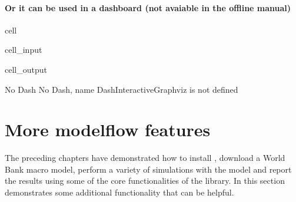\documentclass[letterpaper,10pt,english]{jupyterBook}
\begin{document}
\subsection{Or it can be used in a dashboard (not avaiable in the offline manual)}
\label{\detokenize{content/06_ModelAnalytics/Attribution:or-it-can-be-used-in-a-dashboard-not-avaiable-in-the-offline-manual}}
\begin{sphinxuseclass}{cell}\begin{sphinxVerbatimInput}

\begin{sphinxuseclass}{cell_input}
\begin{sphinxVerbatim}[commandchars=\\\{\}]
\end{sphinxVerbatim}

\end{sphinxuseclass}\end{sphinxVerbatimInput}
\begin{sphinxVerbatimOutput}

\begin{sphinxuseclass}{cell_output}
\begin{sphinxVerbatim}[commandchars=\\\{\}]
No Dash
No Dash, name \PYGZsq{}DashInteractiveGraphviz\PYGZsq{} is not defined
\end{sphinxVerbatim}

\end{sphinxuseclass}\end{sphinxVerbatimOutput}

\end{sphinxuseclass}
\sphinxstepscope


\part{More modelflow features}

\sphinxstepscope

\sphinxAtStartPar
The preceding chapters have demonstrated how to install , download a World Bank macro model, perform a variety of simulations with the model and report the results using some of the core functionalities of the  library. In this section demonstrates some additional functionality that can be helpful.
\end{document}
